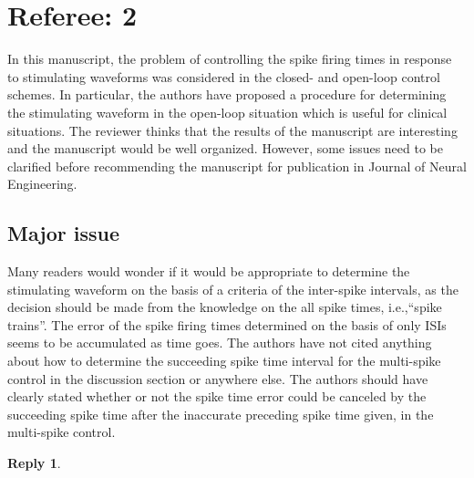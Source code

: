 \documentclass{article}
\newtheorem*{rep}{Reply}
\begin{document}
\clearpage
\section{Referee: 2}

In this manuscript, the problem of controlling the spike firing times in response to stimulating waveforms was considered in the closed- and open-loop control schemes. In particular, the authors have proposed a procedure for determining the stimulating waveform in the open-loop situation which is useful for clinical situations. The reviewer thinks that the results of the manuscript are interesting and the manuscript would be well organized. However, some issues need to be clarified before recommending the manuscript for publication in Journal of Neural Engineering.


\subsection{Major issue}
Many readers would wonder if it would be appropriate to determine the
stimulating waveform on the basis of a criteria of the inter-spike intervals, as
the decision should be made from the knowledge on the all spike times,
i.e.,“spike trains”. The error of the spike firing times determined on the basis
of only ISIs seems to be accumulated as time goes. The authors have not cited
anything about how to determine the succeeding spike time interval for the
multi-spike control in the discussion section or anywhere else. The authors
should have clearly stated whether or not the spike time error could be canceled
by the succeeding spike time after the inaccurate preceding spike time given, in
the multi-spike control.
\begin{rep}

\end{rep}
\end{document}
